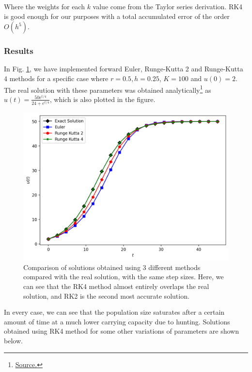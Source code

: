 Where the weights for each $k$ value come from the Taylor series derivation.
RK4 is good enough for our purposes with a total accumulated error of the order $O(h^5)$.

\subsubsection{Results}
In Fig. \ref{5comps}, we have implemented forward Euler, Runge-Kutta 2 and Runge-Kutta 4 methods for a specific case where $r=0.5, h=0.25$, $K=100$ and $u(0)=2$. The real solution with these parameters was obtained analytically\footnote{\href{https://www.wolframalpha.com/input?i=y\%27+\%3D+0.5y*\%281-\%28y\%2F100\%29\%29-0.25y\%2C+y\%280\%29\%3D2}{Source.}} as $u(t) = \frac{50e^{t/4}}{24+e^{t/4}}$, which is also plotted in the figure.

\begin{figure}[H]
    \centering
    \includegraphics[width=0.6\linewidth]{Figures/5/5a/methods.png}
    \caption{Comparison of solutions obtained using 3 different methods compared with the real solution, with the same step sizes. Here, we can see that the RK4 method almost entirely overlaps the real solution, and RK2 is the second most accurate solution.}
    \label{5comps}
\end{figure}

In every case, we can see that the population size saturates after a certain amount of time at a much lower carrying capacity due to hunting. Solutions obtained using RK4 method for some other variations of parameters are shown below.

